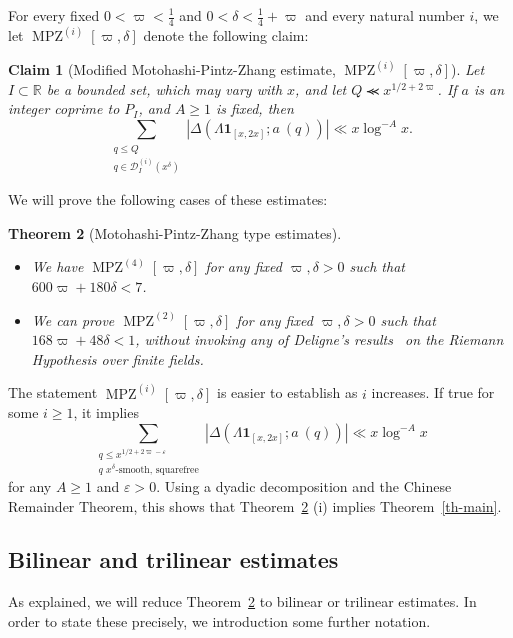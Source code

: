 \documentclass[12pt,a4paper,reqno]{amsart}
\numberwithin{equation}{section}
\DeclareMathOperator*\MPZ{MPZ}
\theoremstyle{plain}
\newtheorem{theorem}{Theorem}[section]
\newtheorem{claim}[theorem]{Claim}
\theoremstyle{definition}
\newcommand\R{\mathbb{R}}
\newcommand\eps{\varepsilon}
\newcommand{\DI}[3]{\mathcal{D}_{{#1}}^{({#2})}({#3})}
\renewcommand{\lessapprox}{\llcurly}
\newcommand{\onef}{\mathbf{1}}
\begin{document}
For every fixed $0 < \varpi < \frac{1}{4}$ and $0 < \delta <
\frac{1}{4}+\varpi$ and every natural number $i$, we let
$\MPZ^{(i)}[\varpi,\delta]$ denote the following claim:


\begin{claim}[Modified Motohashi-Pintz-Zhang estimate,
  {$\MPZ^{(i)}[\varpi,\delta]$}]\label{mpzm-def} Let $I \subset \R$ be
  a bounded set, which may vary with $x$, and let $Q \lessapprox
  x^{1/2+2\varpi}$.  If $a$ is an integer coprime to $P_I$, and $A \geq 1$ is
  fixed, then
\begin{equation}\label{qq-mpz-mod}
  \sum_{\substack{q \leq Q\\ q \in \DI{I}{i}{x^\delta}}}
  |\Delta(\Lambda\onef_{[x,2x]}; a\ (q))| \ll x \log^{-A} x.
\end{equation}
\end{claim}

We will prove the following cases of these estimates:

\begin{theorem}[Motohashi-Pintz-Zhang type estimates]\label{mpz-est}\ 
\begin{itemize}
\item[(i)]  We have $\MPZ^{(4)}[\varpi,\delta]$ for any fixed $\varpi,\delta>0$ such that $600 \varpi + 180 \delta < 7$.
\item[(ii)] We can prove $\MPZ^{(2)}[\varpi,\delta]$ for any fixed
  $\varpi,\delta>0$ such that $168 \varpi + 48 \delta < 1$, without
  invoking any of Deligne's results~\cite{WeilI, WeilII} on the
  Riemann Hypothesis over finite fields.
\end{itemize}
\end{theorem}


The statement $\MPZ^{(i)}[\varpi,\delta]$ is easier to establish as
$i$ increases.  If true for some $i\geq 1$, it implies
$$
  \sum_{\substack{q \leq x^{1/2+2\varpi-\eps}\\q\text{
        $x^{\delta}$-smooth, squarefree}}}
  |\Delta(\Lambda\onef_{[x,2x]}; a\ (q))| \ll x \log^{-A} x
$$
for any $A\geq 1$ and $\eps>0$. Using a dyadic decomposition and the
Chinese Remainder Theorem, this shows that Theorem~\ref{mpz-est} (i)
implies Theorem~\ref{th-main}.

\subsection{Bilinear and trilinear estimates}

As explained, we will reduce Theorem~\ref{mpz-est} to bilinear or
trilinear estimates.  In order to state these precisely, we
introduction some further notation.
\end{document}
